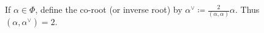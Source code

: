If $\alpha \in \Phi$, define the co-root (or inverse root) by
$\alpha^{\vee}\coloneqq \frac{2}{(\alpha, \alpha)}\alpha$.
Thus $(\alpha, \alpha^{\vee}) = 2.$
